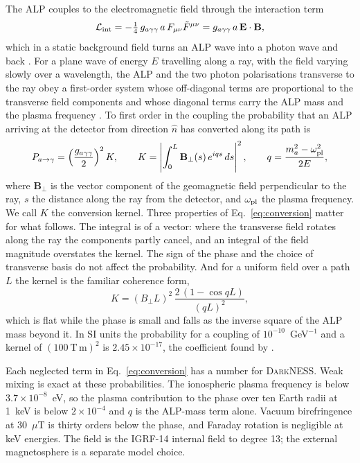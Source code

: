 \documentclass[11pt]{article}
\newcommand{\DarkNESS}{\textsc{DarkNESS}}
\newcommand{\gag}{g_{a\gamma\gamma}}
\begin{document}
The ALP couples to the electromagnetic field through the interaction term
\begin{equation}
\mathcal L_{\rm int}=-\tfrac14\,\gag\,a\,F_{\mu\nu}\tilde F^{\mu\nu}=\gag\,a\,\mathbf E\cdot\mathbf B ,
\label{eq:lagrangian}
\end{equation}
which in a static background field turns an ALP wave into a photon wave and back \citep{raffelt1988mixing}. For a plane wave of energy $E$ travelling along a ray, with the field varying slowly over a wavelength, the ALP and the two photon polarisations transverse to the ray obey a first-order system whose off-diagonal terms are proportional to the transverse field components and whose diagonal terms carry the ALP mass and the plasma frequency \citep{marsh2022fourier}. To first order in the coupling the probability that an ALP arriving at the detector from direction $\hat n$ has converted along its path is
\begin{equation}
P_{a\to\gamma}=\left(\frac{\gag}{2}\right)^{2}K,\qquad
K=\left|\int_{0}^{L}\mathbf B_{\perp}(s)\,e^{iqs}\,ds\right|^{2},\qquad
q=\frac{m_a^{2}-\omega_{\rm pl}^{2}}{2E},
\label{eq:conversion}
\end{equation}
where $\mathbf B_\perp$ is the vector component of the geomagnetic field perpendicular to the ray, $s$ the distance along the ray from the detector, and $\omega_{\rm pl}$ the plasma frequency. We call $K$ the conversion kernel. Three properties of Eq.~\eqref{eq:conversion} matter for what follows. The integral is of a vector: where the transverse field rotates along the ray the components partly cancel, and an integral of the field magnitude overstates the kernel. The sign of the phase and the choice of transverse basis do not affect the probability. And for a uniform field over a path $L$ the kernel is the familiar coherence form,
\begin{equation}
K=(B_\perp L)^{2}\,\frac{2\,(1-\cos qL)}{(qL)^{2}},
\label{eq:coherence}
\end{equation}
which is flat while the phase is small and falls as the inverse square of the ALP mass beyond it. In SI units the probability for a coupling of $10^{-10}$~GeV$^{-1}$ and a kernel of $(100\ \mathrm{T\,m})^2$ is $2.45\times10^{-17}$, the coefficient found by \citet{yamamoto2020alp}.

Each neglected term in Eq.~\eqref{eq:conversion} has a number for \DarkNESS{}. Weak mixing is exact at these probabilities. The ionospheric plasma frequency is below $3.7\times10^{-8}$~eV, so the plasma contribution to the phase over ten Earth radii at 1~keV is below $2\times10^{-4}$ and $q$ is the ALP-mass term alone. Vacuum birefringence at 30~$\mu$T is thirty orders below the phase, and Faraday rotation is negligible at keV energies. The field is the IGRF-14 internal field to degree 13; the external magnetosphere is a separate model choice.
\end{document}

